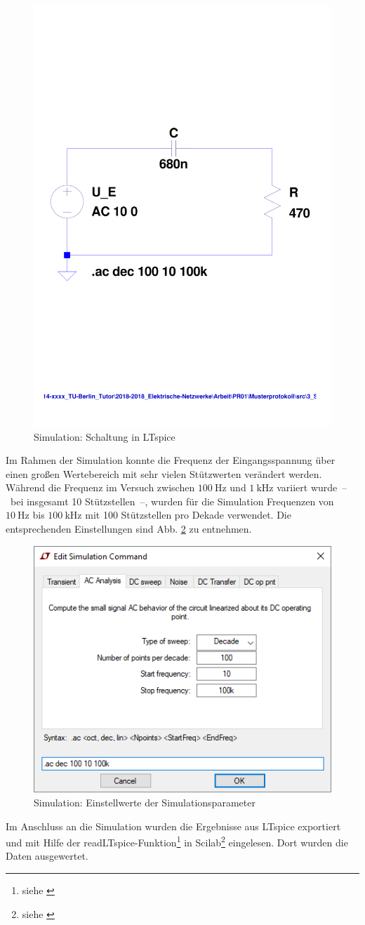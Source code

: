 %
\begin{figure}[H]
  \centering
  \includegraphics[width=0.6\linewidth]{src/3_Sim_Schaltung.pdf}
  \caption{Simulation: Schaltung in LTspice}
  \label{fig:3_Sim_Schaltung}
\end{figure}
%
Im Rahmen der Simulation konnte die Frequenz der Eingangsspannung über einen großen Wertebereich mit sehr vielen Stützwerten verändert werden. Während die Frequenz im Versuch zwischen $\SI{100}{\hertz}$ und $\SI{1}{\kilo\hertz}$ variiert wurde~--~bei insgesamt 10 Stützstellen~--, wurden für die Simulation Frequenzen von $\SI{10}{\hertz}$ bis $\SI{100}{\kilo\hertz}$ mit 100 Stützstellen pro Dekade verwendet. Die entsprechenden Einstellungen sind Abb. \ref{fig:3_Sim_Parameter} zu entnehmen.
%
\begin{figure}[H]
  \centering
  \includegraphics[width=0.7\linewidth]{src/3_Sim_Parameter.png}
  \caption{Simulation: Einstellwerte der Simulationsparameter}
  \label{fig:3_Sim_Parameter}
\end{figure}
%
Im Anschluss an die Simulation wurden die Ergebnisse aus LTspice exportiert und mit Hilfe der readLTspice-Funktion\footnote{siehe \cite{src:readLTspice}} in Scilab\footnote{siehe \cite{src:Scilab}} eingelesen. Dort wurden die Daten ausgewertet.
%
%
%